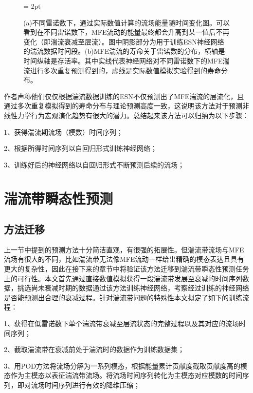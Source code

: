 \begin{figure}[H]
	\subfigbottomskip = 2pt
	\begin{minipage}[h]{0.5\linewidth}
	\centering
	\end{minipage}
	\quad
	\begin{minipage}[h]{0.5\linewidth}
	\centering
	\end{minipage}
	\quad
	\caption{(a)不同雷诺数下，通过实际数值计算的流场能量随时间变化图。可以看到在不同雷诺数下，MFE流动的能量最终都会升高到某一值后不再变化（即湍流衰减至层流）。图中阴影部分为用于训练ESN神经网络的湍流数据时间段。(b)MFE湍流的寿命关于雷诺数的分布，横轴是时间纵轴是存活率。其中实线代表神经网络对不同雷诺数下的MFE湍流进行多次重复预测得到的，虚线是实际数值模拟实验得到的寿命分布。}
\label{fig:MFE}
\end{figure}
作者声称他们仅仅根据湍流数据训练的ESN不仅预测出了MFE湍流的层流化，且通过多次重复模拟得到的寿命分布与理论预测高度一致，这说明该方法对于预测非线性力学行为宏观演化趋势有很大的潜力。总结起来该方法可以归纳为以下步骤：

1、获得湍流期流场（模数）时间序列；

2、根据所得时间序列以自回归形式训练神经网络；

3、训练好后的神经网络以自回归形式不断预测后续的流场；

\section{湍流带瞬态性预测}
\subsection{方法迁移}
上一节中提到的预测方法十分简洁直观，有很强的拓展性。但湍流带流场与MFE流场有很大的不同，比如湍流带无法像MFE流动一样给出精确的模态表达且具有更大的复杂性，因此在接下来的章节中将验证该方法迁移到湍流带瞬态性预测任务上的可行性。本文首先通过直接数值模拟获得一段湍流带发展至衰减的时间序列数据，挑选尚未衰减时期的数据通过该方法训练神经网络，考察经过训练的神经网络是否能预测出合理的衰减过程。针对湍流带问题的特殊性本文拟定了如下的训练流程：

1、获得在低雷诺数下单个湍流带衰减至层流状态的完整过程以及其对应的流场时间序列；

2、截取湍流带在衰减前处于湍流时的数据作为训练数据集；

3、用POD方法将流场分解为一系列模态，根据能量累计贡献度截取贡献度高的模态作为主模态以表征湍流带流场。将流场时间序列转化为主模态对应模数的时间序列，即对流场时间序列进行有效的降维压缩；

